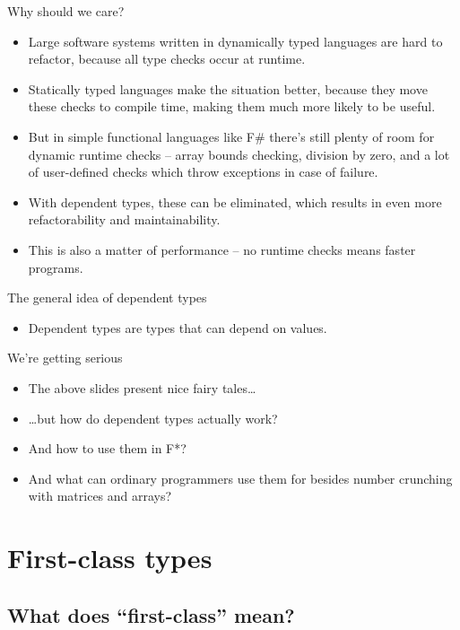 \documentclass{beamer}
\begin{document}
\begin{frame}{Why should we care?}
\begin{itemize}
	\item Large software systems written in dynamically typed languages are hard to refactor, because all type checks occur at runtime.
	\item Statically typed languages make the situation better, because they move these checks to compile time, making them much more likely to be useful.
	\item But in simple functional languages like F\# there's still plenty of room for dynamic runtime checks -- array bounds checking, division by zero, and a lot of user-defined checks which throw exceptions in case of failure.
	\item With dependent types, these can be eliminated, which results in even more refactorability and maintainability.
	\item This is also a matter of performance -- no runtime checks means faster programs.
\end{itemize}
\end{frame}

\begin{frame}{The general idea of dependent types}
\begin{itemize}
	\item Dependent types are types that can depend on values.
\end{itemize}
\end{frame}

\begin{frame}{We're getting serious}
\begin{itemize}
	\item The above slides present nice fairy tales\dots
	\item \dots but how do dependent types actually work?
	\item And how to use them in F*?
	\item And what can ordinary programmers use them for besides number crunching with matrices and arrays?
\end{itemize}
\end{frame}

\section{First-class types}

\subsection{What does ``first-class'' mean?}
\end{document}

